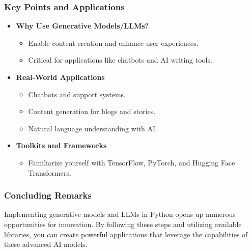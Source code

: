 \documentclass[aspectratio=169]{beamer}
\begin{document}
\begin{frame}[fragile]
    \frametitle{Key Points and Applications}
    \begin{itemize}
        \item \textbf{Why Use Generative Models/LLMs?}
        \begin{itemize}
            \item Enable content creation and enhance user experiences.
            \item Critical for applications like chatbots and AI writing tools.
        \end{itemize}
        
        \item \textbf{Real-World Applications}
        \begin{itemize}
            \item Chatbots and support systems.
            \item Content generation for blogs and stories.
            \item Natural language understanding with AI.
        \end{itemize}
        
        \item \textbf{Toolkits and Frameworks}
        \begin{itemize}
            \item Familiarize yourself with TensorFlow, PyTorch, and Hugging Face Transformers.
        \end{itemize}
    \end{itemize}
\end{frame}

\begin{frame}[fragile]
    \frametitle{Concluding Remarks}
    Implementing generative models and LLMs in Python opens up numerous opportunities for innovation. By following these steps and utilizing available libraries, you can create powerful applications that leverage the capabilities of these advanced AI models.
\end{frame}
\end{document}
